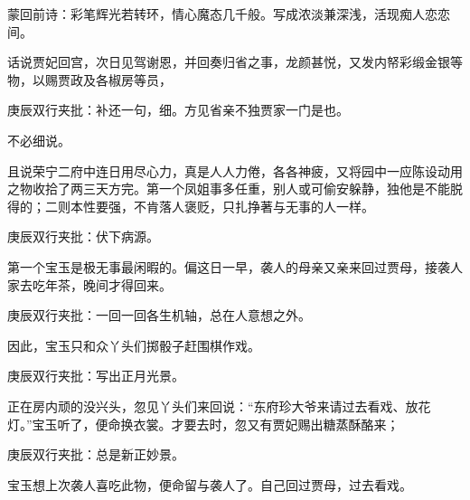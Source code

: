 \begin{parag}

    \begin{note}蒙回前诗：彩笔辉光若转环，情心魔态几千般。写成浓淡兼深浅，活现痴人恋恋间。\end{note}
\end{parag}


\begin{parag}


    话说贾妃回宫，次日见驾谢恩，并回奏归省之事，龙颜甚悦，又发内帑彩缎金银等物，以赐贾政及各椒房等员，\begin{note}庚辰双行夹批：补还一句，细。方见省亲不独贾家一门是也。\end{note}不必细说。
\end{parag}


\begin{parag}


    且说荣宁二府中连日用尽心力，真是人人力倦，各各神疲，又将园中一应陈设动用之物收拾了两三天方完。第一个凤姐事多任重，别人或可偷安躲静，独他是不能脱得的；二则本性要强，不肯落人褒贬，只扎挣著与无事的人一样。\begin{note}庚辰双行夹批：伏下病源。\end{note}第一个宝玉是极无事最闲暇的。偏这日一早，袭人的母亲又亲来回过贾母，接袭人家去吃年茶，晚间才得回来。\begin{note}庚辰双行夹批：一回一回各生机轴，总在人意想之外。\end{note}因此，宝玉只和众丫头们掷骰子赶围棋作戏。\begin{note}庚辰双行夹批：写出正月光景。\end{note}正在房内顽的没兴头，忽见丫头们来回说：“东府珍大爷来请过去看戏、放花灯。”宝玉听了，便命换衣裳。才要去时，忽又有贾妃赐出糖蒸酥酪来；\begin{note}庚辰双行夹批：总是新正妙景。\end{note}宝玉想上次袭人喜吃此物，便命留与袭人了。自己回过贾母，过去看戏。
\end{parag}



